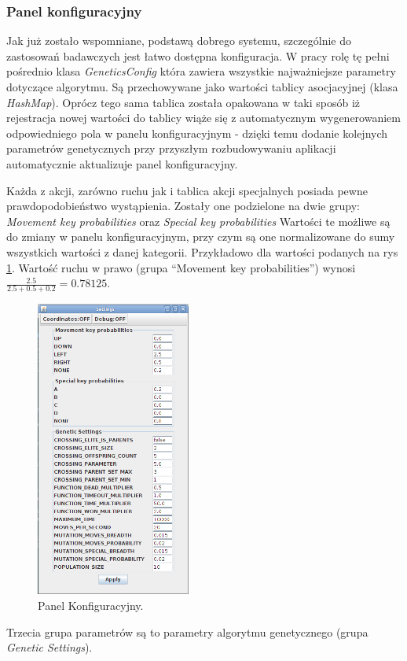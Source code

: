 \subsubsection{Panel konfiguracyjny}
\begin{par}
	Jak już zostało wspomniane, podstawą dobrego systemu, szczególnie do zastosowań badawczych jest łatwo dostępna konfiguracja. 
	W pracy rolę tę pełni pośrednio klasa \textit{GeneticsConfig} która zawiera wszystkie najważniejsze parametry dotyczące algorytmu. Są przechowywane jako wartości tablicy asocjacyjnej (klasa \textit{HashMap}). 
	Oprócz tego sama tablica została opakowana w taki sposób iż rejestracja nowej wartości do tablicy wiąże się z automatycznym wygenerowaniem odpowiedniego pola w panelu konfiguracyjnym - dzięki temu dodanie kolejnych parametrów genetycznych przy przyszłym rozbudowywaniu aplikacji automatycznie aktualizuje panel konfiguracyjny.
\end{par}
\begin{par}
	Każda z akcji, zarówno ruchu jak i tablica akcji specjalnych posiada pewne prawdopodobieństwo wystąpienia.
	Zostały one podzielone na dwie grupy: \textit{Movement key probabilities} oraz \textit{Special key probabilities}
	Wartości te możliwe są do zmiany w panelu konfiguracyjnym, przy czym są one normalizowane do sumy wszystkich wartości z danej kategorii.
	Przykładowo dla wartości podanych na rys \ref{fig:config1}. Wartość ruchu w prawo (grupa ``Movement key probabilities'') wynosi $\frac{2.5}{2.5+0.5+0.2}=0.78125$.
	\begin{figure}[!h]
		\centering
		\includegraphics[width=2in]{obrazki/config1.png}
		\caption{Panel Konfiguracyjny.}
		\label{fig:config1}
	\end{figure}
	Trzecia grupa parametrów są to parametry algorytmu genetycznego (grupa \textit{Genetic Settings}).
\end{par}
